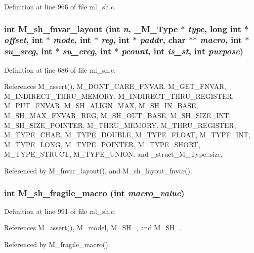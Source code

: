 Definition at line 966 of file ml\_\-sh.c.
\subsubsection{\setlength{\rightskip}{0pt plus 5cm}int M\_\-sh\_\-fnvar\_\-layout (int {\em n}, \bf{\_\-M\_\-Type} $\ast$ {\em type}, long int $\ast$ {\em offset}, int $\ast$ {\em mode}, int $\ast$ {\em reg}, int $\ast$ {\em paddr}, char $\ast$$\ast$ {\em macro}, int $\ast$ {\em su\_\-sreg}, int $\ast$ {\em su\_\-ereg}, int $\ast$ {\em pcount}, int {\em is\_\-st}, int {\em purpose})}\label{m__sh_8h_a69d78fb760ca80d4afed8e4232196a7}




Definition at line 686 of file ml\_\-sh.c.

References M\_\-assert(), M\_\-DONT\_\-CARE\_\-FNVAR, M\_\-GET\_\-FNVAR, M\_\-INDIRECT\_\-THRU\_\-MEMORY, M\_\-INDIRECT\_\-THRU\_\-REGISTER, M\_\-PUT\_\-FNVAR, M\_\-SH\_\-ALIGN\_\-MAX, M\_\-SH\_\-IN\_\-BASE, M\_\-SH\_\-MAX\_\-FNVAR\_\-REG, M\_\-SH\_\-OUT\_\-BASE, M\_\-SH\_\-SIZE\_\-INT, M\_\-SH\_\-SIZE\_\-POINTER, M\_\-THRU\_\-MEMORY, M\_\-THRU\_\-REGISTER, M\_\-TYPE\_\-CHAR, M\_\-TYPE\_\-DOUBLE, M\_\-TYPE\_\-FLOAT, M\_\-TYPE\_\-INT, M\_\-TYPE\_\-LONG, M\_\-TYPE\_\-POINTER, M\_\-TYPE\_\-SHORT, M\_\-TYPE\_\-STRUCT, M\_\-TYPE\_\-UNION, and \_\-struct\_\-M\_\-Type::size.

Referenced by M\_\-fnvar\_\-layout(), and M\_\-sh\_\-layout\_\-fnvar().
\subsubsection{\setlength{\rightskip}{0pt plus 5cm}int M\_\-sh\_\-fragile\_\-macro (int {\em macro\_\-value})}\label{m__sh_8h_ee2a00d6153a6bbf4db6f2ad164422cb}




Definition at line 991 of file ml\_\-sh.c.

References M\_\-assert(), M\_\-model, M\_\-SH\_, and M\_\-SH\_.

Referenced by M\_\-fragile\_\-macro().
